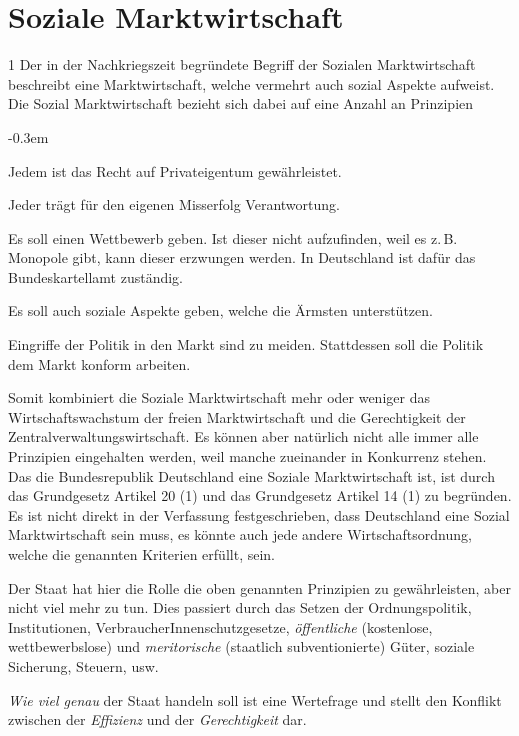\documentclass{article}
\begin{document}
 
 
\section{Soziale Marktwirtschaft}
\begin{multicols}{1}
\noindent Der in der Nachkriegszeit begründete Begriff der Sozialen Marktwirtschaft beschreibt eine Marktwirtschaft, welche vermehrt auch sozial Aspekte aufweist. \newline
Die Sozial Marktwirtschaft bezieht sich dabei auf eine Anzahl an Prinzipien
\begin{description}
 \itemsep-0.3em 
 \item[Eigentumsprinzip] Jedem ist das Recht auf Privateigentum gewährleistet.
 \item[Haftungsprinzip] Jeder trägt für den eigenen Misserfolg Verantwortung.
 \item[Wettbewerbsprinzip] Es soll einen Wettbewerb geben. Ist dieser nicht aufzufinden, weil es z.\,B. Monopole gibt, kann dieser erzwungen werden. In Deutschland ist dafür das Bundeskartellamt zuständig.
 \item[Sozialprinzip] Es soll auch soziale Aspekte geben, welche die Ärmsten unterstützen.
 \item[Marktkonformitätsprinzip] Eingriffe der Politik in den Markt sind zu meiden. Stattdessen soll die Politik dem Markt konform arbeiten.
\end{description}
\columnbreak 
Somit kombiniert die Soziale Marktwirtschaft mehr oder weniger das Wirtschaftswachstum der freien Marktwirtschaft und die Gerechtigkeit der Zentralverwaltungswirtschaft. Es können aber natürlich nicht alle immer alle Prinzipien eingehalten werden, weil manche zueinander in Konkurrenz stehen. \newline 
Das die Bundesrepublik Deutschland eine Soziale Marktwirtschaft ist, ist durch das Grundgesetz Artikel 20 (1)  und das Grundgesetz Artikel 14 (1)  zu begründen. Es ist nicht direkt in der Verfassung festgeschrieben, dass Deutschland eine Sozial Marktwirtschaft sein muss, es könnte auch jede andere Wirtschaftsordnung, welche die genannten Kriterien erfüllt, sein.
\end{multicols}
\noindent Der Staat hat hier die Rolle die oben genannten Prinzipien zu gewährleisten, aber nicht viel mehr zu tun. Dies passiert durch das Setzen der Ordnungspolitik, Institutionen, VerbraucherInnenschutzgesetze, \emph{öffentliche} (kostenlose, wettbewerbslose) und \emph{meritorische} (staatlich subventionierte) Güter, soziale Sicherung, Steuern, usw.
 
\emph{Wie viel genau} der Staat handeln soll ist eine Wertefrage und stellt den Konflikt zwischen der \emph{Effizienz} und der \emph{Gerechtigkeit} dar. 
 
\end{document}
